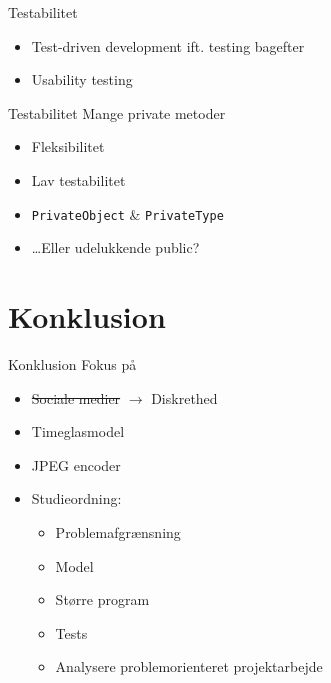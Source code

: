 \begin{frame}{Testabilitet}
    \begin{itemize}
        \item Test-driven development ift. testing bagefter
        \item Usability testing
    \end{itemize}
\end{frame}
\begin{frame}[fragile]{Testabilitet}
    Mange private metoder
    \begin{itemize}
        \item Fleksibilitet %
        \item Lav testabilitet
    \end{itemize}
    \begin{itemize}
        \item<1-> \lstinline|PrivateObject| \& \lstinline|PrivateType|
        \item<2-> \ldots Eller udelukkende public?
    \end{itemize}
\end{frame}

\section{Konklusion}
\begin{frame}{Konklusion}
    Fokus på
    \begin{itemize}
        \item{\sout{Sociale medier} $\rightarrow$ Diskrethed}
        \item {Timeglasmodel}
        \item JPEG encoder
        \item Studieordning:
        \begin{itemize}
            \item\textcolor{green}{\checkmark} Problemafgrænsning
            \item\textcolor{green}{\checkmark} Model
            \item\textcolor{green}{\checkmark} Større program
            \item\textcolor{green}{\checkmark} Tests
            \item\textcolor{green}{\checkmark} Analysere problemorienteret projektarbejde
            \end{itemize}
    \end{itemize}
\end{frame}
